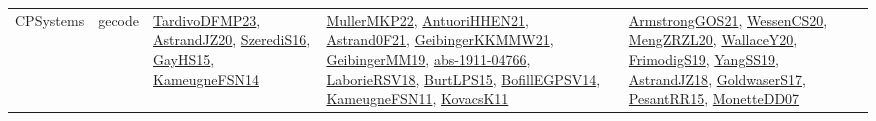 {\begin{longtable}{llp{6cm}p{6cm}p{6cm}}
CPSystems & gecode & \href{papers/TardivoDFMP23.pdf}{TardivoDFMP23}\cite{TardivoDFMP23}, \href{articles/AstrandJZ20.pdf}{AstrandJZ20}\cite{AstrandJZ20}, \href{papers/SzerediS16.pdf}{SzerediS16}\cite{SzerediS16}, \href{papers/GayHS15.pdf}{GayHS15}\cite{GayHS15}, \href{articles/KameugneFSN14.pdf}{KameugneFSN14}\cite{KameugneFSN14} & \href{articles/MullerMKP22.pdf}{MullerMKP22}\cite{MullerMKP22}, \href{papers/AntuoriHHEN21.pdf}{AntuoriHHEN21}\cite{AntuoriHHEN21}, \href{papers/Astrand0F21.pdf}{Astrand0F21}\cite{Astrand0F21}, \href{papers/GeibingerKKMMW21.pdf}{GeibingerKKMMW21}\cite{GeibingerKKMMW21}, \href{papers/GeibingerMM19.pdf}{GeibingerMM19}\cite{GeibingerMM19}, \href{articles/abs-1911-04766.pdf}{abs-1911-04766}\cite{abs-1911-04766}, \href{articles/LaborieRSV18.pdf}{LaborieRSV18}\cite{LaborieRSV18}, \href{papers/BurtLPS15.pdf}{BurtLPS15}\cite{BurtLPS15}, \href{papers/BofillEGPSV14.pdf}{BofillEGPSV14}\cite{BofillEGPSV14}, \href{papers/KameugneFSN11.pdf}{KameugneFSN11}\cite{KameugneFSN11}, \href{articles/KovacsK11.pdf}{KovacsK11}\cite{KovacsK11} & \href{papers/ArmstrongGOS21.pdf}{ArmstrongGOS21}\cite{ArmstrongGOS21}, \href{papers/WessenCS20.pdf}{WessenCS20}\cite{WessenCS20}, \href{articles/MengZRZL20.pdf}{MengZRZL20}\cite{MengZRZL20}, \href{articles/WallaceY20.pdf}{WallaceY20}\cite{WallaceY20}, \href{papers/FrimodigS19.pdf}{FrimodigS19}\cite{FrimodigS19}, \href{papers/YangSS19.pdf}{YangSS19}\cite{YangSS19}, \href{papers/AstrandJZ18.pdf}{AstrandJZ18}\cite{AstrandJZ18}, \href{papers/GoldwaserS17.pdf}{GoldwaserS17}\cite{GoldwaserS17}, \href{papers/PesantRR15.pdf}{PesantRR15}\cite{PesantRR15}, \href{papers/MonetteDD07.pdf}{MonetteDD07}\cite{MonetteDD07}\\

\end{longtable}}
